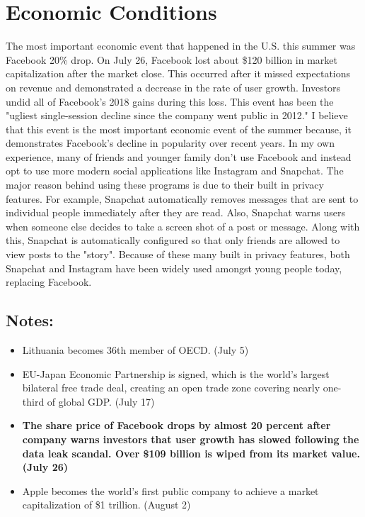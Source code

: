 \documentclass[12pt]{article} %
\begin{document}
\section{Economic Conditions}
The most important economic event that happened in the U.S. this summer was Facebook 20\% drop. On 
July 26, Facebook lost about \$120 billion in market capitalization after the market close. This
occurred after it missed expectations on revenue and demonstrated a decrease in the rate of user
growth. Investors undid all of Facebook's 2018 gains during this loss. This event has been the
"ugliest single-session decline since the company went public in 2012." 
I believe that this event is the most important economic event of the summer because, it demonstrates
Facebook's decline in popularity over recent years. In my own experience, many of friends and 
younger family don't use Facebook and instead opt to use more modern social applications like 
Instagram and Snapchat. The major reason behind using these programs is due to their built in privacy
features. For example, Snapchat automatically removes messages that are sent to individual people
immediately after they are read. Also, Snapchat warns users when someone else decides to take a 
screen shot of a post or message. Along with this, Snapchat is automatically configured so that 
only friends are allowed to view posts to the "story". Because of these many built in privacy features,
both Snapchat and Instagram have been widely used amongst young people today, replacing Facebook.
\subsection*{Notes:}
\begin{itemize}
	\item Lithuania becomes 36th member of OECD. (July 5)
	\item EU-Japan Economic Partnership is signed, which is the world's largest bilateral free trade
	deal, creating an open trade zone covering nearly one-third of global GDP. (July 17)
	\item \textbf{The share price of Facebook drops by almost 20 percent after company warns investors that user growth
	has slowed following the data leak scandal. Over \$109 billion is wiped from its market value. (July 26)}
	\item Apple becomes the world's first public company to achieve a market capitalization of \$1 trillion. (August 2)
\end{itemize}
\end{document}
